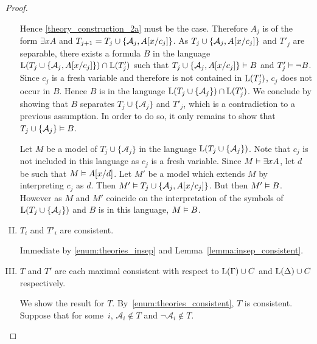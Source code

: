 \begin{proof}
\begin{enumerate}[I.]
			Hence \ref{theory_construction_2a} must be the case. Therefore $A_j$ is of the form $\exists x A$ and $T_{j+1} = T_{j} \cup \{ \mathcal{A}_{j}, A[x/c_j] \}$.
			As $T_{j} \cup \{ \mathcal{A}_{j}, A[x/c_j]  \}$ and $T'_j$ are separable, there exists a formula $B$ in the language $\operatorname{L}(T_{j} \cup \{ \mathcal{A}_{j}, A[x/c_j]  \}) \cap \operatorname{L}(T'_j)$
			such that $ T_{j} \cup \{ \mathcal{A}_{j}, A[x/c_j] \} \vDash B$ and $T'_j \vDash \lnot B$.
			Since $c_j$ is a fresh variable and therefore is not contained in $\operatorname{L}(T'_j)$, $c_j$ does not occur in $B$.
			Hence $B$ is in the language $\operatorname{L}(T_{j} \cup \{ \mathcal{A}_{j} \}) \cap \operatorname{L}(T'_j)$.
			We conclude by showing that $B$ separates $T_{j} \cup \{ \mathcal{A}_{j} \}$ and $T'_{j}$, which is a contradiction to a previous assumption. 
			In order to do so, it only remains to show that 
			$T_{j} \cup \{ \mathcal{A}_{j} \} \vDash B$.


			Let $M$ be a model of $T_{j} \cup \{ \mathcal{A}_{j} \}$ in the language
			$\operatorname{L}(T_{j} \cup \{ \mathcal{A}_{j} \})$. Note that $c_j$ is not included in this language as $c_j$ is a fresh variable.
			Since $M\vDash \exists x A$, let $d$ be such that $M\vDash A[x/d]$.
			Let $M'$ be a model which extends $M$ by interpreting $c_j$ as $d$.
			Then $M' \vDash T_{j} \cup \{ \mathcal{A}_{j}, A[x/c_j] \}$. But then $M' \vDash B$.
			However as $M$ and $M'$ coincide on the interpretation of the symbols of $\operatorname{L}(T_{j} \cup \{ \mathcal{A}_{j} \})$
			and $B$ is in this language, $M\vDash B$.





			\item 
			\label{enum:theories_consistent}
			$T_i$ and $T'_i$ are consistent.

			Immediate by \ref{enum:theories_insep} and Lemma~\ref{lemma:insep_consistent}.

		\item
			\label{enum:each_max_consistent}
			$T$ and $T'$ are each maximal consistent with respect to $\operatorname{L}(\Gamma) \cup C$ and $\operatorname{L}(\Delta) \cup C$ respectively.

			We show the result for $T$.
			By~\ref{enum:theories_consistent}, $T$ is consistent.
			Suppose that for some~$i$, $\mathcal{A}_i \not\in T$ and $\lnot\mathcal{A}_i \not\in T$.


\end{enumerate}
\end{proof}
